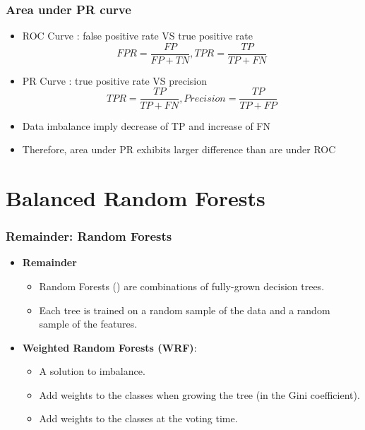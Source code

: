 \documentclass[slidestop,compress,red,mathserif]{beamer}
\begin{document}
\begin{frame}
	\frametitle{Area under PR curve}
	\begin{itemize}
    \item ROC Curve : false positive rate VS true positive rate
    \begin{equation*}
			FPR = \frac{FP}{FP+TN},  TPR = \frac{TP}{TP+FN}
		\end{equation*}
		\item PR Curve : true positive rate VS precision
    \begin{equation*}
			TPR = \frac{TP}{TP+FN},  Precision = \frac{TP}{TP+FP}
		\end{equation*}
    \item Data imbalance imply decrease of TP and increase of FN
    \item Therefore, area under PR exhibits larger difference than are under ROC
	\end{itemize}
\end{frame}


\section{Balanced Random Forests}

\begin{frame}
\frametitle{Remainder: Random Forests}
\begin{itemize}
  \item[] \textbf{Remainder}
    \begin{itemize}
    	\item Random Forests (\cite{Breiman2001}) are combinations of fully-grown decision trees.
    	\item Each tree is trained on a random sample of the data and a random sample of the features.
    \end{itemize}

  \item[] \textbf{Weighted Random Forests (WRF)}:
    \begin{itemize}
      \item A solution to imbalance.
      \item Add weights to the classes when growing the tree (in the Gini coefficient).
      \item Add weights to the classes at the voting time.
    \end{itemize}

\end{itemize}
~~~~~~~~~~~~~~~
\end{frame}
\end{document}
